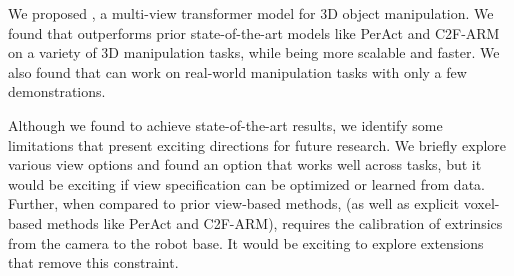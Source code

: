 We proposed \method, a multi-view transformer model for 3D object manipulation. We found that \method outperforms prior state-of-the-art models like PerAct and C2F-ARM on a variety of 3D manipulation tasks, while being more scalable and faster. We also found that \method can work on real-world manipulation tasks with only a few demonstrations. 

Although we found \method to achieve state-of-the-art results, we identify some limitations that present exciting directions for future research. We briefly explore various view options and found an option that works well across tasks, but it would be exciting if view specification can be optimized or learned from data. Further, when compared to prior view-based methods, \method (as well as explicit voxel-based methods like PerAct and C2F-ARM), requires the calibration of extrinsics from the camera to the robot base. It would be exciting to explore extensions that remove this constraint.